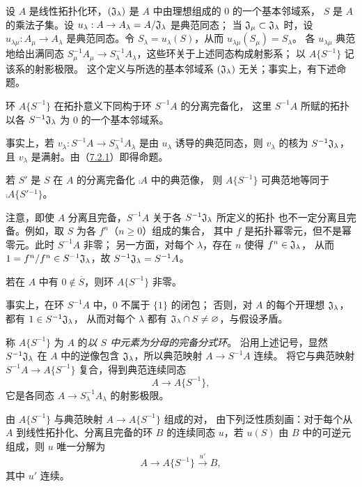 设 $A$ 是线性拓扑化环，$(\mathfrak J_\lambda)$ 是 $A$ 中由理想组成的 $0$ 的一个基本邻域系，
$S$ 是 $A$ 的乘法子集。设 $u_\lambda:A\to A_\lambda=A/\mathfrak J_\lambda$ 是典范同态；
当 $\mathfrak J_\mu\subset\mathfrak J_\lambda$ 时，设 $u_{\lambda\mu}:A_\mu\to A_\lambda$
是典范同态。令 $S_\lambda=u_\lambda(S)$，从而
$u_{\lambda\mu}(S_\mu)=S_\lambda$。
各 $u_{\lambda\mu}$ 典范地给出满同态
$S_\mu^{-1}A_\mu\to S_\lambda^{-1}A_\lambda$，这些环关于上述同态构成射影系；
以 $A\{S^{-1}\}$ 记该系的射影极限。
这个定义与所选的基本邻域系 $(\mathfrak J_\lambda)$ 无关；事实上，有下述命题。

环 $A\{S^{-1}\}$ 在拓扑意义下同构于环 $S^{-1}A$ 的分离完备化，
这里 $S^{-1}A$ 所赋的拓扑以各 $S^{-1}\mathfrak J_\lambda$ 为 $0$ 的一个基本邻域系。

事实上，若 $v_\lambda:S^{-1}A\to S_\lambda^{-1}A_\lambda$ 是由
$u_\lambda$ 诱导的典范同态，则 $v_\lambda$ 的核为 $S^{-1}\mathfrak J_\lambda$，
且 $v_\lambda$ 是满射。由（\hyperlink{para:0:7.2.1}{7.2.1}）即得命题。

若 $S'$ 是 $S$ 在 $A$ 的分离完备化 $\comp A$ 中的典范像，
则 $A\{S^{-1}\}$ 可典范地等同于 $\comp A\{S'{}^{-1}\}$。

注意，即使 $A$ 分离且完备，$S^{-1}A$ 关于各 $S^{-1}\mathfrak J_\lambda$ 所定义的拓扑
也不一定分离且完备。例如，取 $S$ 为各 $f^n$（$n\geq0$）组成的集合，
其中 $f$ 是拓扑幂零元，但不是幂零元。此时 $S^{-1}A$ 非零；
另一方面，对每个 $\lambda$，存在 $n$ 使得 $f^n\in\mathfrak J_\lambda$，
从而 $1=f^n/f^n\in S^{-1}\mathfrak J_\lambda$，故
$S^{-1}\mathfrak J_\lambda=S^{-1}A$。

若在 $A$ 中有 $0\notin\overline S$，则环 $A\{S^{-1}\}$ 非零。

事实上，在环 $S^{-1}A$ 中，$0$ 不属于 $\{1\}$ 的闭包；
否则，对 $A$ 的每个开理想 $\mathfrak J_\lambda$，都有 $1\in S^{-1}\mathfrak J_\lambda$，
从而对每个 $\lambda$ 都有 $\mathfrak J_\lambda\cap S\ne\varnothing$，与假设矛盾。

称 $A\{S^{-1}\}$ 为 $A$ 的\emph{以 $S$ 中元素为分母的完备分式环}。
沿用上述记号，显然 $S^{-1}\mathfrak J_\lambda$ 在 $A$ 中的逆像包含
$\mathfrak J_\lambda$，所以典范映射 $A\to S^{-1}A$ 连续。
将它与典范映射 $S^{-1}A\to A\{S^{-1}\}$ 复合，得到典范连续同态
\[
 A\longrightarrow A\{S^{-1}\},
\]
它是各同态 $A\to S_\lambda^{-1}A_\lambda$ 的射影极限。

由 $A\{S^{-1}\}$ 与典范映射 $A\to A\{S^{-1}\}$ 组成的对，
由下列泛性质刻画：对于每个从 $A$ 到线性拓扑化、分离且完备的环 $B$ 的连续同态
$u$，若 $u(S)$ 由 $B$ 中的可逆元组成，则 $u$ 唯一分解为
\[
 A\longrightarrow A\{S^{-1}\}\xrightarrow{u'}B,
\]
其中 $u'$ 连续。

